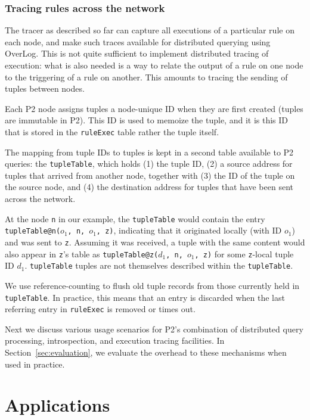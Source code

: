 \documentclass{sig-alt-full}
\def\Sys{P2\xspace}
\def\Lang{OverLog\xspace}
\newcommand{\ol}[1]{{\tt\footnotesize#1}}
\begin{document}
\subsubsection{Tracing rules across the network}
The tracer as described so far can capture all executions of a
particular rule on each node, and make such traces available for
distributed querying using \Lang.  This is not quite
sufficient to implement distributed tracing of execution: what is also needed
is a way to relate the output of a rule on one node to the
triggering of a rule on another.  This amounts to tracing the sending
of tuples between nodes.

Each \Sys node assigns tuples a node-unique ID when they are first
created (tuples are immutable in \Sys).  This ID is used to memoize
the tuple, and it is this ID that is stored in the \ol{ruleExec}
table rather the tuple itself. 

The mapping from tuple IDs to tuples is kept in a second table
available to \Sys queries: the \ol{tupleTable}, which holds (1) the
tuple ID, (2) a source address for tuples that arrived from another
node, together with (3) the ID of the tuple on the source node, and
(4) the destination address for tuples that have been sent across the
network. 

At the node \ol{n} in our example, the \ol{tupleTable} would contain
the entry \ol{tupleTable@n($o_1$, n, $o_1$, z)}, indicating that it
originated locally (with ID $o_1$) and was sent to \ol{z}.  
Assuming it was received, a tuple with the same content would also appear in \ol{z}'s
table as \ol{tupleTable@z($d_1$, n, $o_1$, z)} for some \ol{z}-local
tuple ID $d_1$.  \ol{tupleTable} tuples are not themselves described
within the  \ol{tupleTable}. 

We use reference-counting  to flush old tuple
records from those currently held in \ol{tupleTable}.  In practice, this means that an entry is discarded
when the last referring entry in \ol{ruleExec} is removed or times
out. 

\vspace{10pt}

Next we discuss various usage scenarios for
\Sys's combination of distributed query processing, introspection, and execution tracing facilities.  In
Section~\ref{sec:evaluation}, we evaluate the overhead to these
mechanisms when used in practice. 




\section{Applications}
\label{sec:applications}
\end{document}
